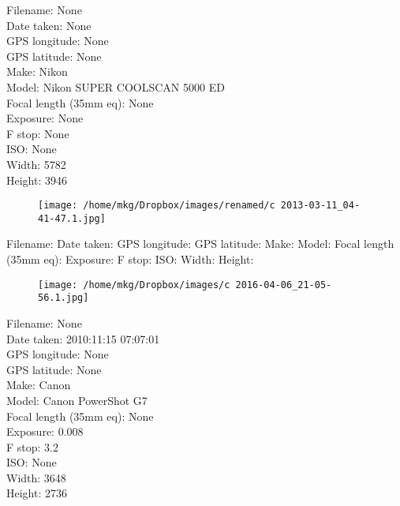 \clearpage
\recalctypearea
\newpage
\noindent
Filename: None\\ 
Date taken: None\\ 
GPS longitude: None\\ 
GPS latitude: None\\ 
Make: Nikon\\ 
Model: Nikon SUPER COOLSCAN 5000 ED\\ 
Focal length (35mm eq): None\\ 
Exposure: None\\ 
F stop: None\\ 
ISO: None\\ 
Width: 5782\\ 
Height: 3946\\ 

\clearpage
\recalctypearea
\newpage
\noindent
\begin{figure}
    \texttt{[image: /home/mkg/Dropbox/images/renamed/c 2013-03-11\_04-41-47.1.jpg]}
\end{figure}

\clearpage
\recalctypearea
\newpage
\noindent
Filename: Date taken: GPS longitude: GPS latitude: Make: Model: Focal length (35mm eq): Exposure: F stop: ISO: Width: Height: 
\clearpage
\recalctypearea
\newpage
\noindent
\begin{figure}
    \texttt{[image: /home/mkg/Dropbox/images/c 2016-04-06\_21-05-56.1.jpg]}
\end{figure}

\clearpage
\recalctypearea
\newpage
\noindent
Filename: None\\ 
Date taken: 2010:11:15 07:07:01\\ 
GPS longitude: None\\ 
GPS latitude: None\\ 
Make: Canon\\ 
Model: Canon PowerShot G7\\ 
Focal length (35mm eq): None\\ 
Exposure: 0.008\\ 
F stop: 3.2\\ 
ISO: None\\ 
Width: 3648\\ 
Height: 2736\\ 


